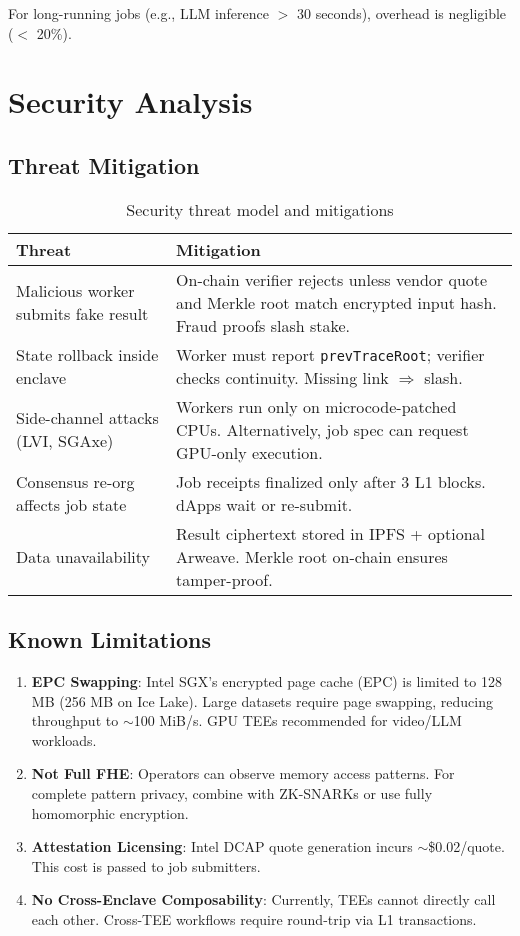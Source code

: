 \documentclass[11pt,letterpaper]{article}
\begin{document}
For long-running jobs (e.g., LLM inference $>$ 30 seconds), overhead is negligible ($<$ 20\%).

\section{Security Analysis}

\subsection{Threat Mitigation}

\begin{table}[h]
\centering
\small
\begin{tabular}{@{}p{4cm}p{8cm}@{}}
\toprule
\textbf{Threat} & \textbf{Mitigation} \\
\midrule
Malicious worker submits fake result & On-chain verifier rejects unless vendor quote and Merkle root match encrypted input hash. Fraud proofs slash stake. \\
\midrule
State rollback inside enclave & Worker must report \texttt{prevTraceRoot}; verifier checks continuity. Missing link $\Rightarrow$ slash. \\
\midrule
Side-channel attacks (LVI, SGAxe) & Workers run only on microcode-patched CPUs. Alternatively, job spec can request GPU-only execution. \\
\midrule
Consensus re-org affects job state & Job receipts finalized only after 3 L1 blocks. dApps wait or re-submit. \\
\midrule
Data unavailability & Result ciphertext stored in IPFS + optional Arweave. Merkle root on-chain ensures tamper-proof. \\
\bottomrule
\end{tabular}
\caption{Security threat model and mitigations}
\label{tab:security}
\end{table}

\subsection{Known Limitations}

\begin{enumerate}
  \item \textbf{EPC Swapping}: Intel SGX's encrypted page cache (EPC) is limited to 128 MB (256 MB on Ice Lake). Large datasets require page swapping, reducing throughput to $\sim$100 MiB/s. GPU TEEs recommended for video/LLM workloads.

  \item \textbf{Not Full FHE}: Operators can observe memory access patterns. For complete pattern privacy, combine with ZK-SNARKs or use fully homomorphic encryption.

  \item \textbf{Attestation Licensing}: Intel DCAP quote generation incurs $\sim$\$0.02/quote. This cost is passed to job submitters.

  \item \textbf{No Cross-Enclave Composability}: Currently, TEEs cannot directly call each other. Cross-TEE workflows require round-trip via L1 transactions.
\end{enumerate}
\end{document}
